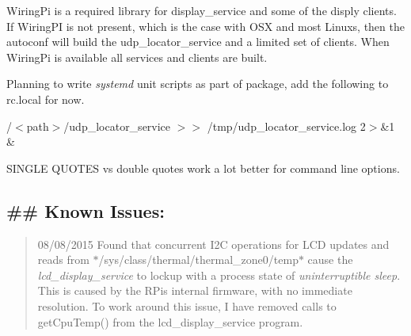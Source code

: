 \begin{DoxyItemize}
\item Wiring\+Pi is a required library for display\+\_\+service and some of the disply clients. If Wiring\+P\+I is not present, which is the case with O\+S\+X and most Linuxs, then the autoconf will build the udp\+\_\+locator\+\_\+service and a limited set of clients. When Wiring\+Pi is available all services and clients are built.
\item Planning to write {\itshape systemd} unit scripts as part of package, add the following to rc.\+local for now.
\begin{DoxyItemize}
\item \textquotesingle{}/$<$path$>$/udp\+\_\+locator\+\_\+service $>$$>$ /tmp/udp\+\_\+locator\+\_\+service.log 2$>$\&1 \&\textquotesingle{}
\end{DoxyItemize}
\item S\+I\+N\+G\+L\+E Q\+U\+O\+T\+E\+S vs double quotes work a lot better for command line options.
\end{DoxyItemize}

\subsection*{\#\# Known Issues\+: }

\begin{quote}
08/08/2015 Found that concurrent I2\+C operations for L\+C\+D updates and reads from $\ast$/sys/class/thermal/thermal\+\_\+zone0/temp$\ast$ cause the {\itshape lcd\+\_\+display\+\_\+service} to lockup with a process state of {\itshape uninterruptible sleep}. This is caused by the R\+Pi\textquotesingle{}s internal firmware, with no immediate resolution. To work around this issue, I have removed calls to get\+Cpu\+Temp() from the lcd\+\_\+display\+\_\+service program.\end{quote}
